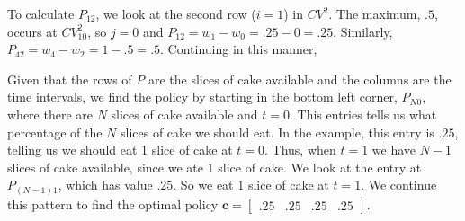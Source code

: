 \begin{center}
\end{center}

To calculate $P_{12}$, we look at the second row ($i=1$) in $CV^2$.
The maximum, $.5$, occurs at $CV_{10}^2$, so $j=0$ and $P_{12} = w_1-w_0 = .25-0=.25$.
Similarly, $P_{42} = w_4-w_2 = 1-.5 = .5$.
Continuing in this manner,
\begin{center}
\end{center}

Given that the rows of $P$ are the slices of cake available and the columns are the time intervals, we find the policy by starting in the bottom left corner, $P_{N0}$, where there are $N$ slices of cake available and $t=0$.
This entries tells us what percentage of the $N$ slices of cake we should eat.
In the example, this entry is $.25$, telling us we should eat 1 slice of cake at $t=0$.
Thus, when $t=1$ we have $N-1$ slices of cake available, since we ate $1$ slice of cake.
We look at the entry at $P_{(N-1)1}$, which has value $.25$. 
So we eat 1 slice of cake at $t=1$.
We continue this pattern to find the optimal policy $\mathbf{c}=\begin{bmatrix}.25&.25&.25&.25\end{bmatrix}$.

